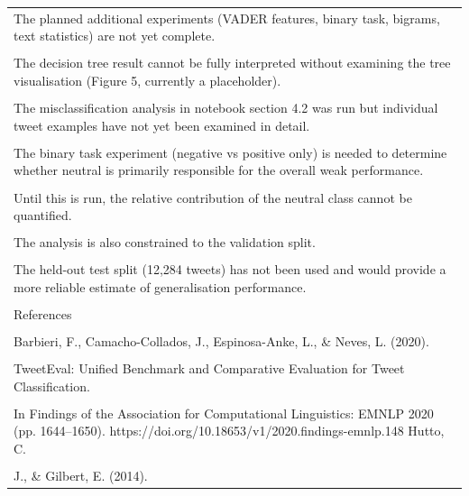 \documentclass[11pt]{article}
\begin{document}
\begin{longtable}{|p{\dimexpr\linewidth-2\tabcolsep-2\arrayrulewidth\relax}|}
\hline
\rule{0pt}{3.5cm} \\
\hline
The planned additional experiments (VADER features, binary task, bigrams, text statistics) are not yet complete. \\[2pt]
\hline
\rule{0pt}{3.5cm} \\
\hline
The decision tree result cannot be fully interpreted without examining the tree visualisation (Figure 5, currently a placeholder). \\[2pt]
\hline
\rule{0pt}{3.5cm} \\
\hline
The misclassification analysis in notebook section 4.2 was run but individual tweet examples have not yet been examined in detail. \\[2pt]
\hline
\rule{0pt}{3.5cm} \\
\hline
The binary task experiment (negative vs positive only) is needed to determine whether neutral is primarily responsible for the overall weak performance. \\[2pt]
\hline
\rule{0pt}{3.5cm} \\
\hline
Until this is run, the relative contribution of the neutral class cannot be quantified. \\[2pt]
\hline
\rule{0pt}{3.5cm} \\
\hline
The analysis is also constrained to the validation split. \\[2pt]
\hline
\rule{0pt}{3.5cm} \\
\hline
The held-out test split (12,284 tweets) has not been used and would provide a more reliable estimate of generalisation performance. \\[2pt]
\hline
\rule{0pt}{3.5cm} \\
\hline
References \\[2pt]
\hline
\rule{0pt}{3.5cm} \\
\hline
Barbieri, F., Camacho-Collados, J., Espinosa-Anke, L., \& Neves, L. (2020). \\[2pt]
\hline
\rule{0pt}{3.5cm} \\
\hline
TweetEval: Unified Benchmark and Comparative Evaluation for Tweet Classification. \\[2pt]
\hline
\rule{0pt}{3.5cm} \\
\hline
In Findings of the Association for Computational Linguistics: EMNLP 2020 (pp. 1644--1650). https://doi.org/10.18653/v1/2020.findings-emnlp.148 Hutto, C. \\[2pt]
\hline
\rule{0pt}{3.5cm} \\
\hline
J., \& Gilbert, E. (2014). \\[2pt]

\end{longtable}
\end{document}
